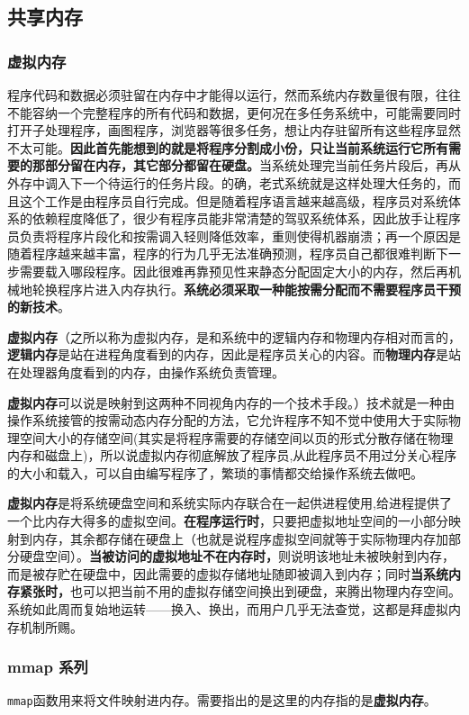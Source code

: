 \documentclass[UTF8,a4paper,12pt]{ctexbook}
\begin{document}
		\subsection{共享内存}
			\subsubsection{虚拟内存}
				程序代码和数据必须驻留在内存中才能得以运行，然而系统内存数量很有限，往往不能容纳一个完整程序的所有代码和数据，更何况在多任务系统中，可能需要同时打开子处理程序，画图程序，浏览器等很多任务，想让内存驻留所有这些程序显然不太可能。\textbf{因此首先能想到的就是将程序分割成小份，只让当前系统运行它所有需要的那部分留在内存，其它部分都留在硬盘。}当系统处理完当前任务片段后，再从外存中调入下一个待运行的任务片段。的确，老式系统就是这样处理大任务的，而且这个工作是由程序员自行完成。但是随着程序语言越来越高级，程序员对系统体系的依赖程度降低了，很少有程序员能非常清楚的驾驭系统体系，因此放手让程序员负责将程序片段化和按需调入轻则降低效率，重则使得机器崩溃；再一个原因是随着程序越来越丰富，程序的行为几乎无法准确预测，程序员自己都很难判断下一步需要载入哪段程序。因此很难再靠预见性来静态分配固定大小的内存，然后再机械地轮换程序片进入内存执行。\textbf{系统必须采取一种能按需分配而不需要程序员干预的新技术}。
				
				\textbf{虚拟内存}（之所以称为虚拟内存，是和系统中的逻辑内存和物理内存相对而言的，\textbf{逻辑内存}是站在进程角度看到的内存，因此是程序员关心的内容。而\textbf{物理内存}是站在处理器角度看到的内存，由操作系统负责管理。
				
				\textbf{虚拟内存}可以说是映射到这两种不同视角内存的一个技术手段。）技术就是一种由操作系统接管的按需动态内存分配的方法，它允许程序不知不觉中使用大于实际物理空间大小的存储空间(其实是将程序需要的存储空间以页的形式分散存储在物理内存和磁盘上)，所以说虚拟内存彻底解放了程序员,从此程序员不用过分关心程序的大小和载入，可以自由编写程序了，繁琐的事情都交给操作系统去做吧。

				\textbf{虚拟内存}是将系统硬盘空间和系统实际内存联合在一起供进程使用,给进程提供了一个比内存大得多的虚拟空间。\textbf{在程序运行时}，只要把虚拟地址空间的一小部分映射到内存，其余都存储在硬盘上（也就是说程序虚拟空间就等于实际物理内存加部分硬盘空间）。\textbf{当被访问的虚拟地址不在内存时，}则说明该地址未被映射到内存，而是被存贮在硬盘中，因此需要的虚拟存储地址随即被调入到内存；同时\textbf{当系统内存紧张时，}也可以把当前不用的虚拟存储空间换出到硬盘，来腾出物理内存空间。系统如此周而复始地运转——换入、换出，而用户几乎无法查觉，这都是拜虚拟内存机制所赐。
			\subsubsection{mmap 系列}
				\verb|mmap|函数用来将文件映射进内存。需要指出的是这里的内存指的是\textbf{虚拟内存}。
				
\end{document}
